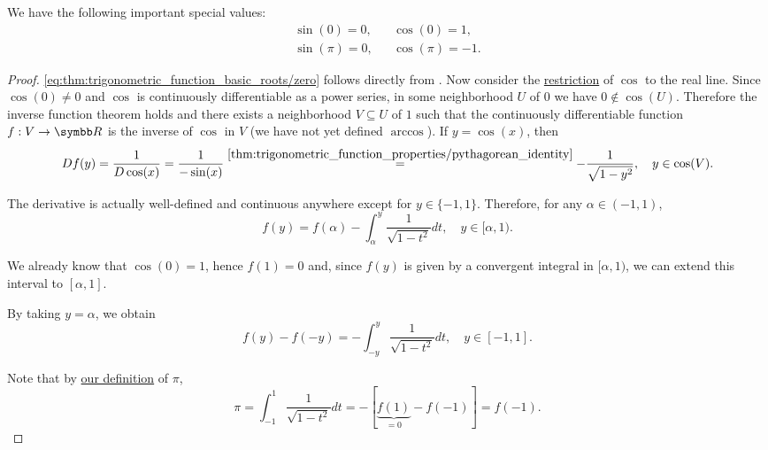 \begin{lemma}\label{thm:trigonometric_function_roots}
  We have the following important special values:
  \begin{align}
    \sin(0) = 0,   &  & \cos(0) = 1,    \label{eq:thm:trigonometric_function_basic_roots/zero} \\
    \sin(\pi) = 0, &  & \cos(\pi) = -1. \label{eq:thm:trigonometric_function_basic_roots/pi}
  \end{align}
\end{lemma}
\begin{proof}
\ref{eq:thm:trigonometric_function_basic_roots/zero} follows directly from .
  Now consider the \hyperref[def:function/extension]{restriction} of \( \cos \) to the real line. Since \( \cos(0) \neq 0 \) and \( \cos \) is continuously differentiable as a power series, in some neighborhood \( U \) of \( 0 \) we have \( 0 \not\in \cos(U) \). Therefore the inverse function theorem holds and there exists a neighborhood \( V \subseteq U \) of \( 1 \) such that the continuously differentiable function \( f: V \to \BR \) is the inverse of \( \cos \) in \( V \) (we have not yet defined \hyperref[def:inverse_trigonometric_functions/arccos]{\( \arccos \)}). If \( y = \cos(x) \), then
  \begin{equation*}
    Df(y)
    =
    \frac 1 {D\cos(x)}
    =
    \frac 1 {-\sin(x)}
    \overset {\ref{thm:trigonometric_function_properties/pythagorean_identity}} =
    -\frac 1 {\sqrt{1 - y^2}},
    \quad y \in \cos(V).
  \end{equation*}

  The derivative is actually well-defined and continuous anywhere except for \( y \in \{ -1, 1 \} \). Therefore, for any \( \alpha \in (-1, 1) \),
  \begin{equation*}
    f(y) = f(\alpha) - \int_{\alpha}^y \frac 1 {\sqrt{1 - t^2}} dt, \quad y \in [\alpha, 1).
  \end{equation*}

  We already know that \( \cos(0) = 1 \), hence \( f(1) = 0 \) and, since \( f(y) \) is given by a convergent integral in \( [\alpha, 1) \), we can extend this interval to \( [\alpha, 1] \).

  By taking \( y = \alpha \), we obtain
  \begin{equation*}
    f(y) - f(-y) = -\int_{-y}^y \frac 1 {\sqrt{1 - t^2}} dt, \quad y \in [-1, 1].
  \end{equation*}

  Note that by \hyperref[def:pi]{our definition} of \( \pi \),
  \begin{equation*}
    \pi
    =
    \int_{-1}^1 \frac 1 {\sqrt{1 - t^2}} dt
    =
    -[\underbrace{f(1)}_{=0} - f(-1)]
    =
    f(-1).
  \end{equation*}


\end{proof}
